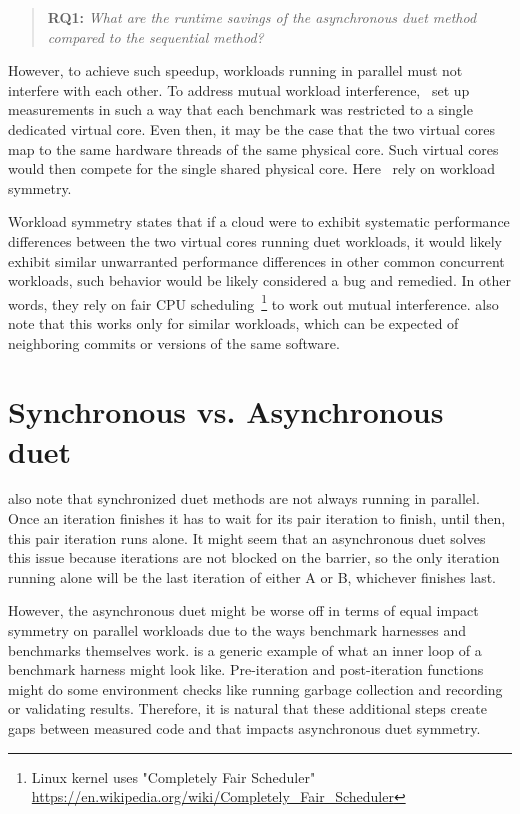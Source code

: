 \begin{quote}
	\textbf{RQ1:} \emph{What are the runtime savings of the asynchronous duet method compared to the sequential method?}
\end{quote}

However, to achieve such speedup, workloads running in parallel must not interfere with each other.
To address mutual workload interference,~\citet{bulej2020duet} set up measurements in such a way that each benchmark was restricted to a single dedicated virtual core.
Even then, it may be the case that the two virtual cores map to the same hardware threads of the same physical core.
Such virtual cores would then compete for the single shared physical core.
Here~\citet{bulej2019initial} rely on workload symmetry.

Workload symmetry states that if a cloud were to exhibit systematic performance differences between the two virtual cores running duet workloads, it would likely exhibit similar unwarranted performance differences in other common concurrent workloads, such behavior would be likely considered a bug and remedied.
In other words, they rely on fair CPU scheduling~\footnote{Linux kernel uses "Completely Fair Scheduler" \url{https://en.wikipedia.org/wiki/Completely_Fair_Scheduler}} to work out mutual interference.
\citet{bulej2019initial} also note that this works only for similar workloads, which can be expected of neighboring commits or versions of the same software.


\section{Synchronous vs. Asynchronous duet}

 also note that synchronized duet methods are not always running in parallel.
Once an iteration finishes it has to wait for its pair iteration to finish, until then, this pair iteration runs alone.
It might seem that an asynchronous duet solves this issue because iterations are not blocked on the barrier, so the only iteration running alone will be the last iteration of either A or B, whichever finishes last.

However, the asynchronous duet might be worse off in terms of equal impact symmetry on parallel workloads due to the ways benchmark harnesses and benchmarks themselves work.
 is a generic example of what an inner loop of a benchmark harness might look like.
Pre-iteration and post-iteration functions might do some environment checks like running garbage collection and recording or validating results.
Therefore, it is natural that these additional steps create gaps between measured code and that impacts asynchronous duet symmetry.

